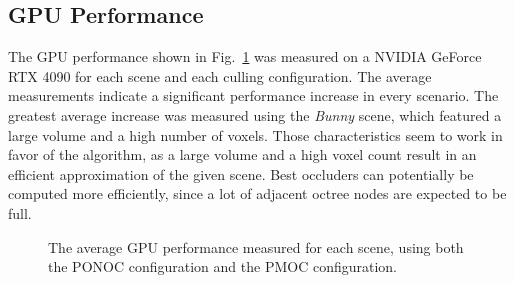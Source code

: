 \documentclass[conference]{IEEEtran}
\begin{document}
\subsection{GPU Performance} \label{subsec-gpu-performance}

\noindent
The \ac{GPU} performance shown in Fig.~\ref{fig:gpu-performance-full} was measured on a NVIDIA GeForce RTX 4090 
for each scene and each culling configuration. The average measurements indicate a significant performance 
increase in every scenario. The greatest average increase was measured using the \emph{Bunny} scene, which 
featured a large volume and a high number of voxels. Those characteristics seem to work in favor of the 
algorithm, as a large volume and a high voxel count result in an efficient approximation of the given scene. 
Best occluders can potentially be computed more efficiently, since a lot of adjacent octree nodes are expected 
to be full. \\

\begin{figure}
    \begin{center}
    \end{center}
    \caption{The average \ac{GPU} performance measured for each scene, using both the \ac{PONOC} 
    configuration and the \ac{PMOC} configuration.}
    \label{fig:gpu-performance-full}
\end{figure}
\end{document}

